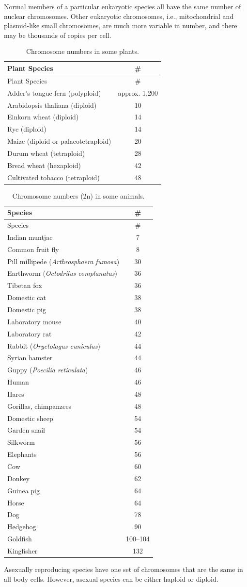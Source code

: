 Normal members of a particular eukaryotic species all have the same number of nuclear chromosomes. Other eukaryotic chromosomes, i.e., mitochondrial and plasmid-like small chromosomes, are much more variable in number, and there may be thousands of copies per cell.

\begin{longtable}[]{@{}lc@{}}
\caption{\label{tab:numplants} Chromosome numbers in some plants.}\tabularnewline
\toprule
Plant Species & \#\tabularnewline
\midrule
\endfirsthead
\toprule
Plant Species & \#\tabularnewline
\midrule
\endhead
Adder's tongue fern (polyploid) & approx. 1,200\tabularnewline
Arabidopsis thaliana (diploid) & 10\tabularnewline
Einkorn wheat (diploid) & 14\tabularnewline
Rye (diploid) & 14\tabularnewline
Maize (diploid or palaeotetraploid) & 20\tabularnewline
Durum wheat (tetraploid) & 28\tabularnewline
Bread wheat (hexaploid) & 42\tabularnewline
Cultivated tobacco (tetraploid) & 48\tabularnewline
\bottomrule
\end{longtable}

\begin{longtable}[]{@{}lc@{}}
\caption{\label{tab:numanimals} Chromosome numbers (2n) in some animals.}\tabularnewline
\toprule
Species & \#\tabularnewline
\midrule
\endfirsthead
\toprule
Species & \#\tabularnewline
\midrule
\endhead
Indian muntjac & 7\tabularnewline
Common fruit fly & 8\tabularnewline
Pill millipede (\emph{Arthrosphaera fumosa}) & 30\tabularnewline
Earthworm (\emph{Octodrilus complanatus}) & 36\tabularnewline
Tibetan fox & 36\tabularnewline
Domestic cat & 38\tabularnewline
Domestic pig & 38\tabularnewline
Laboratory mouse & 40\tabularnewline
Laboratory rat & 42\tabularnewline
Rabbit (\emph{Oryctolagus cuniculus}) & 44\tabularnewline
Syrian hamster & 44\tabularnewline
Guppy (\emph{Poecilia reticulata}) & 46\tabularnewline
Human & 46\tabularnewline
Hares & 48\tabularnewline
Gorillas, chimpanzees & 48\tabularnewline
Domestic sheep & 54\tabularnewline
Garden snail & 54\tabularnewline
Silkworm & 56\tabularnewline
Elephants & 56\tabularnewline
Cow & 60\tabularnewline
Donkey & 62\tabularnewline
Guinea pig & 64\tabularnewline
Horse & 64\tabularnewline
Dog & 78\tabularnewline
Hedgehog & 90\tabularnewline
Goldfish & 100--104\tabularnewline
Kingfisher & 132\tabularnewline
\bottomrule
\end{longtable}

Asexually reproducing species have one set of chromosomes that are the same in all body cells. However, asexual species can be either haploid or diploid.

